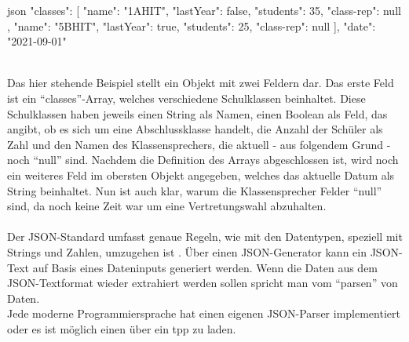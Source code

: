 		\begin{code}{json}
		{
			"classes": [
				{
					"name": "1AHIT",
					"lastYear": false,
					"students": 35,
					"class-rep": null
				},
				{
					"name": "5BHIT",
					"lastYear": true,
					"students": 25,
					"class-rep": null
				}
			],
			"date": "2021-09-01"
		}
		\end{code}
		\label{code:json}~\\
		Das hier stehende Beispiel stellt ein Objekt mit zwei Feldern dar. Das erste Feld ist ein \enquote{classes}-Array, welches verschiedene Schulklassen beinhaltet. Diese Schulklassen haben jeweils einen String als Namen, einen Boolean als Feld, das angibt, ob es sich um eine Abschlussklasse handelt, die Anzahl der Schüler als Zahl und den Namen des Klassensprechers, die aktuell - aus folgendem Grund - noch \enquote{null} sind. Nachdem die Definition des Arrays abgeschlossen ist, wird noch ein weiteres Feld im obersten Objekt angegeben, welches das aktuelle Datum als String beinhaltet. Nun ist auch klar, warum die Klassensprecher Felder \enquote{null} sind, da noch keine Zeit war um eine Vertretungswahl abzuhalten.
		\\~\\
		Der JSON-Standard umfasst genaue Regeln, wie mit den Datentypen, speziell mit Strings und Zahlen, umzugehen ist \cite{rfc4627}.
		Über einen JSON-Generator kann ein JSON-Text auf Basis eines Dateninputs generiert werden. Wenn die Daten aus dem JSON-Textformat wieder extrahiert werden sollen spricht man vom \enquote{parsen} von Daten.\\
		Jede moderne Programmiersprache hat einen eigenen JSON-Parser implementiert oder es ist möglich einen über ein \Gls{tpp} zu laden.

